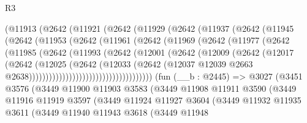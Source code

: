 \begin{lexlean}{R3}
\begin{coremodule}
            (@11913
              (@2642
                (@11921
                  (@2642
                    (@11929
                      (@2642
                        (@11937
                          (@2642
                            (@11945
                              (@2642
                                (@11953
                                  (@2642
                                    (@11961
                                      (@2642
                                        (@11969
                                          (@2642
                                            (@11977
                                              (@2642
                                                (@11985
                                                  (@2642
                                                    (@11993
                                                      (@2642
                                                        (@12001
                                                          (@2642
                                                            (@12009
                                                              (@2642
                                                                (@12017
                                                                  (@2642
                                                                    (@12025
                                                                      (@2642
                                                                        (@12033
                                                                          (@2642
                                                                            (@12037
                                                                              @12039
                                                                              @2663
                                                                              @2638)))))))))))))))))))))))))))))))))))))
    (fun (__b : @2445) =>
    @3027
      (@3451
        @3576
        (@3449
          @11900
          @11903
          @3583
          (@3449
            @11908
            @11911
            @3590
            (@3449
              @11916
              @11919
              @3597
              (@3449
                @11924
                @11927
                @3604
                (@3449
                  @11932
                  @11935
                  @3611
                  (@3449
                    @11940
                    @11943
                    @3618
                    (@3449
                      @11948

\end{coremodule}
\end{lexlean}
